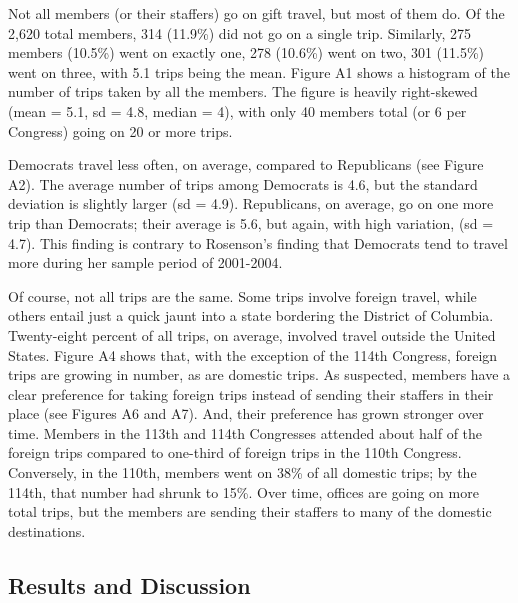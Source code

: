 \documentclass[12pt]{article}                           %
\begin{document}
Not all members (or their staffers) go on gift travel, but most of them do. Of the 2,620 total members, 314 (11.9\%) did not go on a single trip. Similarly, 275 members (10.5\%) went on exactly one, 278 (10.6\%) went on two, 301 (11.5\%) went on three, with 5.1 trips being the mean. Figure A1 shows a histogram of the number of trips taken by all the members. The figure is heavily right-skewed (mean = 5.1, sd = 4.8, median = 4), with only 40 members total (or 6 per Congress) going on 20 or more trips.

Democrats travel less often, on average, compared to Republicans (see Figure A2). The average number of trips among Democrats is 4.6, but the standard deviation is slightly larger (sd = 4.9). Republicans, on average, go on one more trip than Democrats; their average is 5.6, but again, with high variation, (sd = 4.7). This finding is contrary to Rosenson's finding that Democrats tend to travel more during her sample period of 2001-2004.

Of course, not all trips are the same. Some trips involve foreign travel, while others entail just a quick jaunt into a state bordering the District of Columbia. Twenty-eight percent of all trips, on average, involved travel outside the United States. Figure A4 shows that, with the exception of the 114th Congress, foreign trips are growing in number, as are domestic trips. As suspected, members have a clear preference for taking foreign trips instead of sending their staffers in their place (see Figures A6 and A7). And, their preference has grown stronger over time. Members in the 113th and 114th Congresses attended about half of the foreign trips compared to one-third of foreign trips in the 110th Congress. Conversely, in the 110th, members went on 38\% of all domestic trips; by the 114th, that number had shrunk to 15\%. Over time, offices are going on more total trips, but the members are sending their staffers to many of the domestic destinations.

\subsection*{\centering Results and Discussion}
\end{document}
